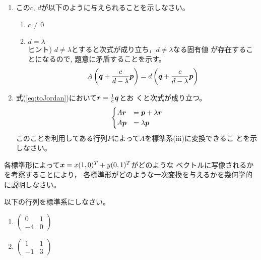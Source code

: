 \documentclass[twocolumn,11pt]{jarticle}
\begin{document}
\begin{enumerate}
\item この$c$, $d$が以下のように与えられることを示しなさい。
  \begin{enumerate}
  \item $c\ne 0$
  \item $d=\lambda$\\
    ヒント) $d\ne\lambda$とすると次式が成り立ち，$d\ne \lambda$なる固有値
    が存在することになるので, 題意に矛盾することを示す。
    \begin{align}
      A\left(\boldsymbol{q}+\frac{c}{d-\lambda}\boldsymbol{p}\right)
      =d\left(\boldsymbol{q}+\frac{c}{d-\lambda}\boldsymbol{p}\right)\notag
    \end{align}
  \end{enumerate}
\item 式(\ref{eq:toJordan})において$\boldsymbol{r}=\frac{1}{c}\boldsymbol{q}$とお
  くと次式が成り立つ。
  \begin{align}
    \begin{cases}
      A\boldsymbol{r}&=\boldsymbol{p}+\lambda\boldsymbol{r}\\
      A\boldsymbol{p}&=\lambda\boldsymbol{p}
    \end{cases}\notag
  \end{align}
  このことを利用してある行列$P$によって$A$を標準系(iii)に変換できるこ
  とを示しなさい。
\end{enumerate}

\nquestion
各標準形によって$\boldsymbol{x}=x(1,0)^T+y(0,1)^T$がどのような
ベクトルに写像されるかを考察することにより，
各標準形がどのような一次変換を与えるかを幾何学的に説明しなさい。


\exercise
以下の行列を標準系にしなさい。
\begin{enumerate}
\item $
  \begin{pmatrix}
    0 & 1 \\
    -4 & 0
  \end{pmatrix}
$
\item  $
  \begin{pmatrix}
    1 & 1 \\
    -1 & 3
  \end{pmatrix}
$
\end{enumerate}
\end{document}
